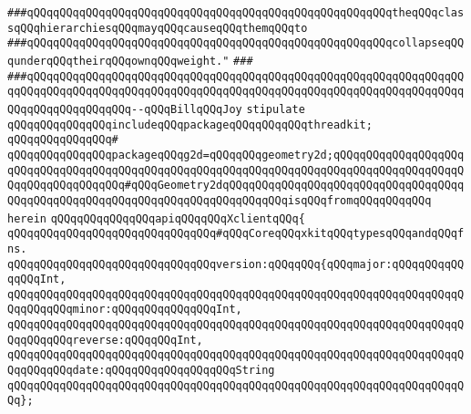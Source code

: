 \verb|###qQQqqQQqqQQqqQQqqQQqqQQqqQQqqQQqqQQqqQQqqQQqqQQqqQQqqQQqtheqQQqclassqQQqhierarchiesqQQqmayqQQqcauseqQQqthemqQQqto|\newline
\verb|###qQQqqQQqqQQqqQQqqQQqqQQqqQQqqQQqqQQqqQQqqQQqqQQqqQQqqQQqcollapseqQQqunderqQQqtheirqQQqownqQQqweight."|\newline
\verb|###|\newline
\verb|###qQQqqQQqqQQqqQQqqQQqqQQqqQQqqQQqqQQqqQQqqQQqqQQqqQQqqQQqqQQqqQQqqQQqqQQqqQQqqQQqqQQqqQQqqQQqqQQqqQQqqQQqqQQqqQQqqQQqqQQqqQQqqQQqqQQqqQQqqQQqqQQqqQQqqQQqqQQq--qQQqBillqQQqJoy|\newline
\newline
\newline
\newline
\verb|stipulate|\newline
\verb|qQQqqQQqqQQqqQQqincludeqQQqpackageqQQqqQQqqQQqthreadkit;|\newline
\verb|qQQqqQQqqQQqqQQq#|\newline
\verb|qQQqqQQqqQQqqQQqpackageqQQqg2d=qQQqqQQqgeometry2d;qQQqqQQqqQQqqQQqqQQqqQQqqQQqqQQqqQQqqQQqqQQqqQQqqQQqqQQqqQQqqQQqqQQqqQQqqQQqqQQqqQQqqQQqqQQqqQQqqQQqqQQqqQQq#qQQqGeometry2dqQQqqQQqqQQqqQQqqQQqqQQqqQQqqQQqqQQqqQQqqQQqqQQqqQQqqQQqqQQqqQQqqQQqqQQqqQQqqQQqisqQQqfromqQQqqQQqqQQq|\newline
\verb|herein|\newline
\newline
\verb|qQQqqQQqqQQqqQQqapiqQQqqQQqXclientqQQq{|\newline
\newline
\newline
\newline
\verb|qQQqqQQqqQQqqQQqqQQqqQQqqQQqqQQq#qQQqCoreqQQqxkitqQQqtypesqQQqandqQQqfns.|\newline
\newline
\verb|qQQqqQQqqQQqqQQqqQQqqQQqqQQqqQQqversion:qQQqqQQq{qQQqmajor:qQQqqQQqqQQqqQQqInt,|\newline
\verb|qQQqqQQqqQQqqQQqqQQqqQQqqQQqqQQqqQQqqQQqqQQqqQQqqQQqqQQqqQQqqQQqqQQqqQQqqQQqqQQqminor:qQQqqQQqqQQqqQQqInt,|\newline
\verb|qQQqqQQqqQQqqQQqqQQqqQQqqQQqqQQqqQQqqQQqqQQqqQQqqQQqqQQqqQQqqQQqqQQqqQQqqQQqqQQqreverse:qQQqqQQqInt,|\newline
\verb|qQQqqQQqqQQqqQQqqQQqqQQqqQQqqQQqqQQqqQQqqQQqqQQqqQQqqQQqqQQqqQQqqQQqqQQqqQQqqQQqdate:qQQqqQQqqQQqqQQqqQQqString|\newline
\verb|qQQqqQQqqQQqqQQqqQQqqQQqqQQqqQQqqQQqqQQqqQQqqQQqqQQqqQQqqQQqqQQqqQQqqQQq};|\newline
